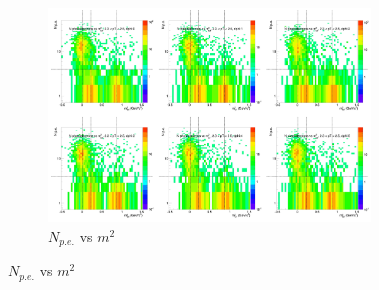 \begin{figure}[H]
  \centering
    \begin{subfigure}{1\textwidth}
   \centering
   \includegraphics[width=0.94\textwidth]{hiptfits/pos/PSaccthreshold_cent0_ich1_accfire0_ptbin9.jpg}
    \caption{$N_{p.e.}$ vs $m^2$}
    \end{subfigure}
\end{figure}
